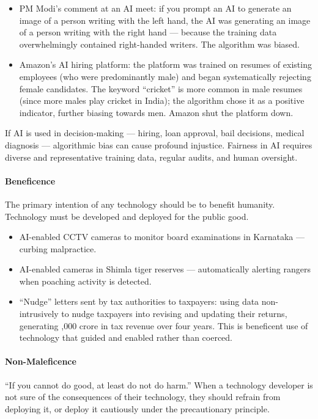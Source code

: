 \begin{ExampleBox}
\begin{itemize}
\item PM Modi's comment at an AI meet: if you prompt an AI to generate an image of a person writing with the left hand, the AI was generating an image of a person writing with the right hand --- because the training data overwhelmingly contained right-handed writers. The algorithm was biased.
\item Amazon's AI hiring platform: the platform was trained on resumes of existing employees (who were predominantly male) and began systematically rejecting female candidates. The keyword ``cricket'' is more common in male resumes (since more males play cricket in India); the algorithm chose it as a positive indicator, further biasing towards men. Amazon shut the platform down.
\end{itemize}
\end{ExampleBox}

If AI is used in decision-making --- hiring, loan approval, bail decisions, medical diagnosis --- algorithmic bias can cause profound injustice. Fairness in AI requires diverse and representative training data, regular audits, and human oversight.

\paragraph{Beneficence} The primary intention of any technology should be to benefit humanity. Technology must be developed and deployed for the public good.

\begin{ExampleBox}
\begin{itemize}
\item AI-enabled CCTV cameras to monitor board examinations in Karnataka --- curbing malpractice.
\item AI-enabled cameras in Shimla tiger reserves --- automatically alerting rangers when poaching activity is detected.
\item ``Nudge'' letters sent by tax authorities to taxpayers: using data non-intrusively to nudge taxpayers into revising and updating their returns, generating ,000 crore in tax revenue over four years. This is beneficent use of technology that guided and enabled rather than coerced.
\end{itemize}
\end{ExampleBox}

\paragraph{Non-Maleficence} ``If you cannot do good, at least do not do harm.'' When a technology developer is not sure of the consequences of their technology, they should refrain from deploying it, or deploy it cautiously under the precautionary principle.

